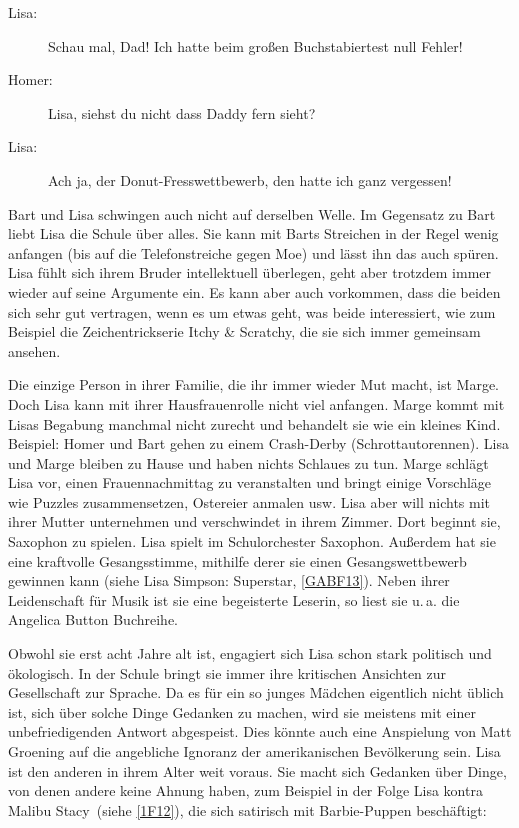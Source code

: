 \begin{description}
	\item[Lisa:] \glqq Schau mal, Dad! Ich hatte beim großen Buchstabiertest null Fehler!\grqq
	\item[Homer:] \glqq Lisa, siehst du nicht dass Daddy fern sieht?\grqq
	\item[Lisa:] \glqq Ach ja, der Donut-Fresswettbewerb, den hatte ich ganz vergessen!\grqq
\end{description}

Bart und Lisa schwingen auch nicht auf derselben Welle. Im Gegensatz zu Bart liebt Lisa die Schule über alles. Sie kann mit Barts Streichen in der Regel wenig anfangen (bis auf die Telefonstreiche gegen Moe) und lässt ihn das auch spüren. Lisa fühlt sich ihrem Bruder intellektuell überlegen, geht aber trotzdem immer wieder auf seine Argumente ein. Es kann aber auch vorkommen, dass die beiden sich sehr gut vertragen, wenn es um etwas geht, was beide interessiert, wie zum Beispiel die Zeichentrickserie \glqq Itchy \& Scratchy\grqq , die sie sich immer gemeinsam ansehen.

Die einzige Person in ihrer Familie, die ihr immer wieder Mut macht, ist Marge. Doch Lisa kann mit ihrer Hausfrauenrolle nicht viel anfangen. Marge kommt mit Lisas Begabung manchmal nicht zurecht und behandelt sie wie ein kleines Kind. Beispiel: Homer und Bart gehen zu einem Crash-Derby (Schrottautorennen). Lisa und Marge bleiben zu Hause und haben nichts Schlaues zu tun. Marge schlägt Lisa vor, einen Frauennachmittag zu veranstalten und bringt einige Vorschläge wie Puzzles zusammensetzen, Ostereier anmalen usw. Lisa aber will nichts mit ihrer Mutter unternehmen und verschwindet in ihrem Zimmer. Dort beginnt sie, Saxophon zu spielen. Lisa spielt im Schulorchester Saxophon. Außerdem hat sie eine kraftvolle Gesangsstimme, mithilfe derer sie einen Gesangswettbewerb gewinnen kann (siehe \glqq Lisa Simpson: Superstar\grqq , \ref{GABF13}). Neben ihrer Leidenschaft für Musik ist sie eine begeisterte Leserin, so liest sie u.\,a. die Angelica Button Buchreihe.

Obwohl sie erst acht Jahre alt ist, engagiert sich Lisa schon stark politisch und ökologisch. In der Schule bringt sie immer ihre kritischen Ansichten zur Gesellschaft zur Sprache. Da es für ein so junges Mädchen eigentlich nicht üblich ist, sich über solche Dinge Gedanken zu machen, wird sie meistens mit einer unbefriedigenden Antwort abgespeist. Dies könnte auch eine Anspielung von Matt Groening auf die angebliche Ignoranz der amerikanischen Bevölkerung sein. Lisa ist den anderen in ihrem Alter weit voraus. Sie macht sich Gedanken über Dinge, von denen andere keine Ahnung haben, zum Beispiel in der Folge \glqq Lisa kontra Malibu Stacy\grqq\ (siehe \ref{1F12}), die sich satirisch mit Barbie-Puppen beschäftigt:

